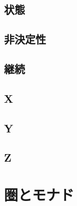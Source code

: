 \documentclass[twocolumn]{jsbook}
\begin{document}
\chapter{状態}

\chapter{非決定性}

\chapter{継続}

\chapter{X}

\chapter{Y}

\chapter{Z}


\part{圏とモナド}
\end{document}
